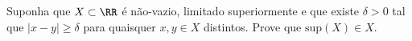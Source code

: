 Suponha que $X \subset \RR$ é não-vazio, limitado superiormente e que existe $\delta > 0$ tal que $| x - y | \ge \delta$ para quaisquer $x, y \in X$ distintos.
Prove que $\mathrm{sup}(X) \in X$.
